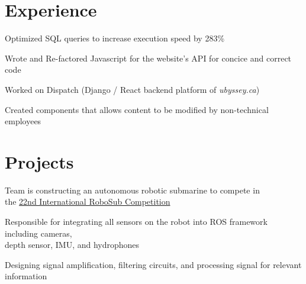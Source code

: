 \documentclass[]{deedy-resume-openfont}
\begin{document}

\section{Experience}

\begin{tightemize}
	\item Optimized SQL queries to increase execution speed by 283\%
	\item Wrote and Re-factored Javascript for the website’s API for concice and correct code
\end{tightemize}
\sectionsep

\begin{tightemize}
	\item Worked on Dispatch (Django / React backend platform of \textit{ubyssey.ca})
    \item Created components that allows content to be modified by non-technical employees
    \vspace{10pt}
\end{tightemize}
\sectionsep

\section{Projects}
\begin{tightemize}
	\item Team is constructing an autonomous robotic submarine to compete in \\ the \href{https://www.robonation.org/competition/robosub}{22nd International RoboSub Competition}
	\item Responsible for  integrating all sensors on the robot into ROS framework including cameras, \\ depth sensor, IMU, and hydrophones
	\item Designing signal amplification, filtering circuits, and processing signal for relevant information
\end{tightemize}
\sectionsep
\end{document}
